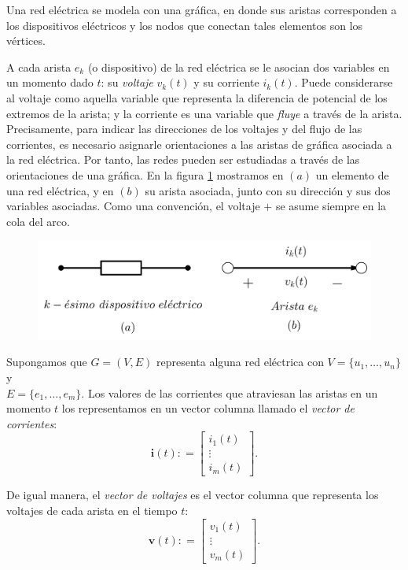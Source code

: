 Una red eléctrica se modela con una gráfica, en donde sus aristas corresponden a los dispositivos eléctricos y los nodos que conectan tales elementos son los vértices.

A cada arista $e_{k}$ (o dispositivo) de la red eléctrica se le asocian dos variables en un momento dado $t$: su \textit{voltaje} $v_{k}(t)$ y su corriente $i_{k}(t)$. Puede considerarse al voltaje como aquella variable que representa la  diferencia de potencial de los extremos de la arista; y la corriente es una variable que \textit{fluye} a través de la arista.  Precisamente, para indicar las direcciones de los voltajes y del flujo de las corrientes, es necesario asignarle orientaciones a las aristas de gráfica asociada a la red eléctrica. Por tanto, las redes pueden ser estudiadas a través de las orientaciones de una gráfica. En la figura \ref{fig:dispositivo electrico} mostramos en $(a)$ un elemento de una red eléctrica, y en $(b)$ su arista asociada, junto con su dirección y sus dos variables asociadas. Como una convención, el voltaje $+$ se asume siempre en la cola del arco.

\begin{figure}[H]
    \centering
    \includegraphics[scale=0.25]{img/imgchapter4/dispositivoelectrico.jpg}
    \caption{}
    \label{fig:dispositivo electrico}
\end{figure}

Supongamos que $G=(V,E)$ representa alguna red eléctrica con $V=\{u_{1}, \ldots, u_{n} \}$ y \\$E =\{e_{1}, \ldots, e_{m}\}$. Los valores de las corrientes que atraviesan las aristas en un momento $t$ los representamos en un vector columna llamado el \textit{vector de corrientes}:
$$
\mathbf{i}(t): = \begin{bmatrix} 
i_{1}(t) \\
\vdots \\
i_{m}(t)
\end{bmatrix}.
$$

De igual manera, el \textit{vector de voltajes} es el vector columna que representa los voltajes de cada arista en el tiempo $t$:
$$
\mathbf{v}(t): = \begin{bmatrix} 
v_{1}(t) \\
\vdots \\
v_{m}(t)
\end{bmatrix}.
$$

